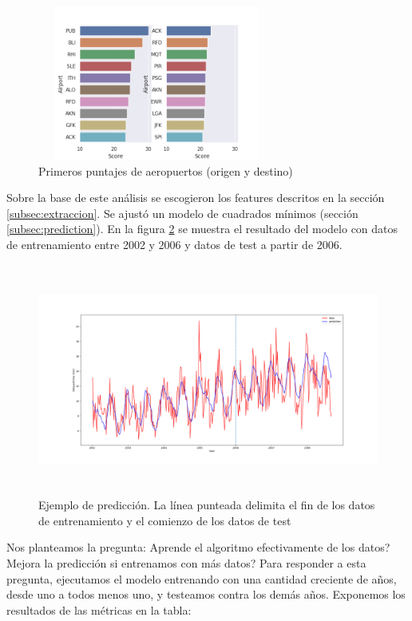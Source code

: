 \begin{figure}[hbtp]
  \centering
  \includegraphics[width=0.7\textwidth, height=2in]{plots/airport_scores_2008.png}
  \caption{Primeros puntajes de aeropuertos (origen y destino)}
  \label{fig:airport_scores}
\end{figure}

Sobre la base de este an\'alisis se escogieron los features descritos en la secci\'on \ref{subsec:extraccion}.
Se ajust\'o un modelo de cuadrados m\'inimos (secci\'on \ref{subsec:prediction}).
En la figura \ref{fig:example_fit_prediction} se muestra el resultado del modelo con datos de entrenamiento
entre 2002 y 2006 y datos de test a partir de 2006.

\begin{figure}[hbtp]
  \centering
  \includegraphics[width=\textwidth, height=3in]{plots/example_fit_and_prediction.png}
  \caption{Ejemplo de predicci\'on. La l\'inea punteada delimita el fin de los datos de
  entrenamiento y el comienzo de los datos de test}
  \label{fig:example_fit_prediction}
\end{figure}

Nos planteamos la pregunta: \textquestiondown Aprende el algoritmo efectivamente de los datos? \textquestiondown Mejora la predicci\'on si
entrenamos con m\'as datos? Para responder a esta pregunta, ejecutamos el modelo entrenando con una cantidad
creciente de a\~nos, desde uno a todos menos uno, y testeamos contra los dem\'as a\~nos. Exponemos
los resultados de las m\'etricas en la tabla:

